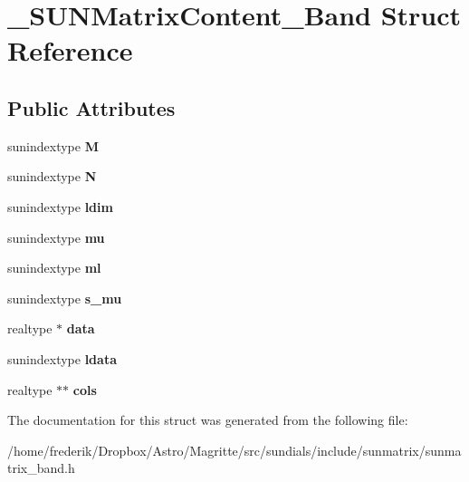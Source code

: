 \hypertarget{struct__SUNMatrixContent__Band}{}\section{\+\_\+\+S\+U\+N\+Matrix\+Content\+\_\+\+Band Struct Reference}
\label{struct__SUNMatrixContent__Band}
\subsection*{Public Attributes}
\begin{DoxyCompactItemize}
\item 
\mbox{\label{struct__SUNMatrixContent__Band_a77063371fa3adc0a44b93c594e7a96e8}} 
sunindextype {\bfseries M}
\item 
\mbox{\label{struct__SUNMatrixContent__Band_ac80174df3d0b4760597a7dcd2cb506a7}} 
sunindextype {\bfseries N}
\item 
\mbox{\label{struct__SUNMatrixContent__Band_a6a64ade8bb48a340c9a441316799cbfb}} 
sunindextype {\bfseries ldim}
\item 
\mbox{\label{struct__SUNMatrixContent__Band_a95117062f858931957acf5e85c58a2f8}} 
sunindextype {\bfseries mu}
\item 
\mbox{\label{struct__SUNMatrixContent__Band_a42e30b37c15fc2eca8ad694e75382c4a}} 
sunindextype {\bfseries ml}
\item 
\mbox{\label{struct__SUNMatrixContent__Band_a411fe69735511e6bf3579e9ce79d18f3}} 
sunindextype {\bfseries s\+\_\+mu}
\item 
\mbox{\label{struct__SUNMatrixContent__Band_a156853f5f03f0dac3d42d4eec22ad007}} 
realtype $\ast$ {\bfseries data}
\item 
\mbox{\label{struct__SUNMatrixContent__Band_aa00866f79fa5f8c94f64f73407ee07a1}} 
sunindextype {\bfseries ldata}
\item 
\mbox{\label{struct__SUNMatrixContent__Band_a318ad87991dfe5b856d54c2c16805fab}} 
realtype $\ast$$\ast$ {\bfseries cols}
\end{DoxyCompactItemize}


The documentation for this struct was generated from the following file\+:\begin{DoxyCompactItemize}
\item 
/home/frederik/\+Dropbox/\+Astro/\+Magritte/src/sundials/include/sunmatrix/sunmatrix\+\_\+band.\+h\end{DoxyCompactItemize}
